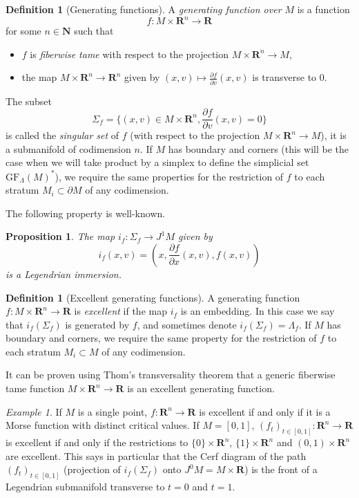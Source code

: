 \documentclass[12pt,a4paper]{article}
\numberwithin{equation}{section}
\newtheorem{prop}[equation]{Proposition}
\theoremstyle{definition}
\newtheorem{dfn}[equation]{Definition}
\theoremstyle{remark}
\newtheorem{ex}[equation]{Example}
\newcommand{\R}{\mathbf{R}}
\newcommand{\N}{\mathbf{N}}
\newcommand{\del}{\partial}
\newcommand{\GF}{\mathrm{GF}}
\begin{document}
\begin{dfn}[Generating functions]\label{dfn:gf}
A \emph{generating function over $M$} is a function
\[f:M\times \R^n\to \R\]
for some $n\in \N$ such that
\begin{itemize}
\item $f$ is \emph{fiberwise tame} with respect to the projection $M\times \R^n \to M$,
\item the map $M\times \R^n\to \R^n$ given by $(x,v) \mapsto \frac{\del f}{\del v}(x,v)$ is transverse to $0$.
\end{itemize}
The subset
\[\Sigma_f=\{(x,v)\in M\times \R^n, \frac{\del f}{\del v}(x,v)=0\}\]
is called the \emph{singular set} of $f$ (with respect to the projection $M\times \R^n \to M$),
it is a submanifold of codimension $n$.
If $M$ has boundary and corners (this will be the case when we will take product by a simplex to define the simplicial set $\GF_\Lambda(M)^*$), we require the same properties for the restriction of $f$ to each stratum $M_i\subset \del M$ of any codimension.
\end{dfn}

The following property is well-known.
\begin{prop}
The map $i_f:\Sigma_f \to J^1 M$ given by
\[i_f(x,v)=(x,\frac{\del f}{\del x}(x,v),f(x,v))\]
is a Legendrian immersion.
\end{prop}

\begin{dfn}[Excellent generating functions]
A generating function $f:M\times \R^n\to \R$ is \emph{excellent} if the map $i_f$ is an embedding. In this case we say that
$i_f(\Sigma_f)$ is generated by $f$, and sometimes denote $i_f(\Sigma_f)=\Lambda_f$.
If $M$ has boundary and corners, we require the same property for the restriction of $f$ to each stratum $M_i\subset M$ of any codimension.
\end{dfn}

It can be proven using Thom's transversality theorem that a generic fiberwise tame function
$M\times \R^n\to \R$ is an excellent generating function.


\begin{ex}
If $M$ is a single point, $f:\R^n\to \R$ is excellent if and only if it is a Morse function with distinct critical values.
If $M=[0,1]$, $(f_t)_{t\in[0,1]}:\R^n \to \R$ is excellent if and only if the restrictions to $\{0\}\times \R^n$, $\{1\}\times \R^n$ and  $(0,1)\times \R^n$ are excellent. This says in particular that the Cerf diagram of the path $(f_t)_{t\in [0,1]}$ (projection of $i_f(\Sigma_f)$ onto $J^0 M=M\times \R$)
is the front of a Legendrian submanifold transverse to $t=0$ and $t=1$.
\end{ex}
\end{document}
